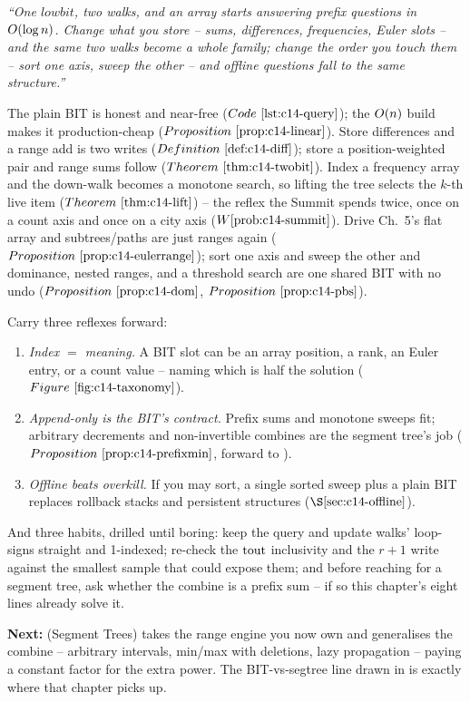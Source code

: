 \begin{lastword}
\emph{``One \(\mathit{lowbit}\), two walks, and an array starts answering prefix
questions in \(O(\log n)\). Change what you store -- sums, differences,
frequencies, Euler slots -- and the same two walks become a whole family; change
the order you touch them -- sort one axis, sweep the other -- and offline
questions fall to the same structure.''}

\medskip
The plain BIT is honest and near-free (\(\coderef{c14-query}\)); the \(O(n)\)
build makes it production-cheap (\(\propref{c14-linear}\)). Store differences and
a range add is two writes (\(\defref{c14-diff}\)); store a position-weighted pair
and range sums follow (\(\thmref{c14-twobit}\)). Index a frequency array and the
down-walk becomes a monotone search, so lifting the tree selects the \(k\)-th live
item (\(\thmref{c14-lift}\)) -- the reflex the Summit spends twice, once on a count
axis and once on a city axis (\(\probref{c14-summit}\)). Drive Ch.~5's flat array
and subtrees/paths are just ranges again (\(\propref{c14-eulerrange}\)); sort one
axis and sweep the other and dominance, nested ranges, and a threshold search are
one shared BIT with no undo (\(\propref{c14-dom}\), \(\propref{c14-pbs}\)).

\medskip
Carry three reflexes forward:
\begin{enumerate}[nosep, leftmargin=1.6em]
  \item \emph{Index \(=\) meaning.} A BIT slot can be an array position, a rank, an
        Euler entry, or a count value -- naming which is half the solution
        (\(\figref{c14-taxonomy}\)).
  \item \emph{Append-only is the BIT's contract.} Prefix sums and monotone sweeps
        fit; arbitrary decrements and non-invertible combines are the segment
        tree's job (\(\propref{c14-prefixmin}\), forward to ).
  \item \emph{Offline beats overkill.} If you may sort, a single sorted sweep plus
        a plain BIT replaces rollback stacks and persistent structures
        (\(\secref{c14-offline}\)).
\end{enumerate}

\medskip
And three habits, drilled until boring: keep the query and update walks'
loop-signs straight and 1-indexed; re-check the \(\operatorname{tout}\) inclusivity and the
\(r{+}1\) write against the smallest sample that could expose them; and before
reaching for a segment tree, ask whether the combine is a prefix sum -- if so this
chapter's eight lines already solve it.

\medskip
\textbf{Next:}  (Segment Trees) takes the range engine you now own and
generalises the combine -- arbitrary intervals, min/max with deletions, lazy
propagation -- paying a constant factor for the extra power. The BIT-vs-segtree
line drawn in  is exactly where that chapter picks up.
\end{lastword}
